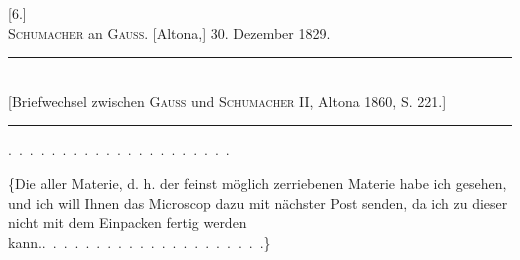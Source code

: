 \clearpage\begingroup{}
\begin{center}
[6.]\\[.7em]
\textsc{Schumacher} an \textsc{Gauss}. [Altona,] 30. Dezember 1829.
\par\smallskip\rule{.78\textwidth}{.35pt}\\
{\small [Briefwechsel zwischen \textsc{Gauss} und \textsc{Schumacher} II, Altona 1860, S. 221.]}\\
\rule{.78\textwidth}{.35pt}
\end{center}
\noindent .\ .\ .\ .\ .\ .\ .\ .\ .\ .\ .\ .\ .\ .\ .\ .\ .\ .\ .\ .\ .
\par\noindent\hspace*{\parindent}\{Die  aller Materie, d. h. der feinst möglich zerriebenen Materie
habe ich  gesehen, und ich will Ihnen das Microscop dazu
mit nächster Post senden, da ich zu dieser nicht mit dem Einpacken fertig
werden kann.\quad \mbox{.\ .\ .\ .\ .\ .\ .\ .\ .\ .\ .\ .\ .\ .\ .\ .\ .\ .\ .\ .\ .\}}
\clearpage\endgroup
